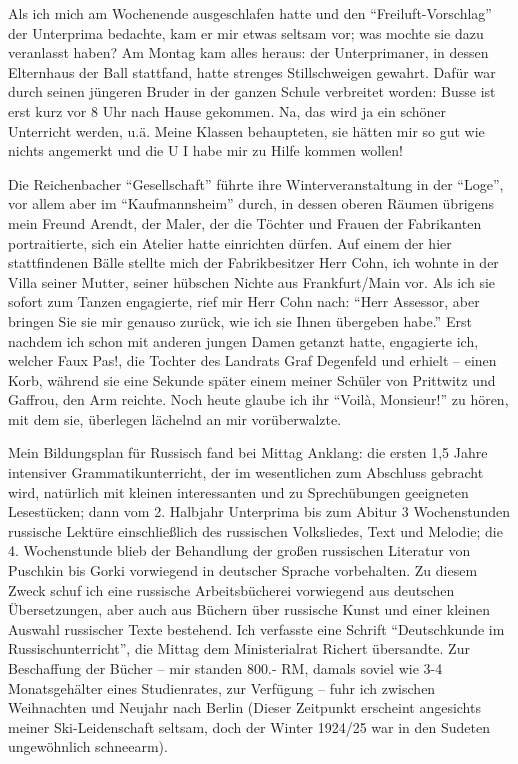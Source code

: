 \documentclass[a5paper,pagesize,10pt,twoside=true]{scrbook}
\begin{document}
Als ich mich am Wochenende ausgeschlafen hatte und den \enquote{Freiluft-Vor\-schlag} der Unterprima bedachte, kam er mir etwas seltsam vor; was mochte sie dazu veranlasst haben? Am Montag kam alles heraus: der Unterprimaner, in dessen Elternhaus der Ball stattfand, hatte strenges Stillschweigen gewahrt. Dafür war durch seinen jüngeren Bruder in der ganzen Schule verbreitet worden: Busse ist erst kurz vor 8 Uhr nach Hause gekommen. Na, das wird ja ein schöner Unterricht werden, u.ä. Meine Klassen behaupteten, sie hätten mir so gut wie nichts angemerkt und die U I habe mir zu Hilfe kommen wollen!

Die Reichenbacher \enquote{Gesellschaft} führte ihre Winterveranstaltung in der \enquote{Loge}, vor allem aber im \enquote{Kaufmannsheim} durch, in dessen oberen Räumen übrigens mein Freund Arendt, der Maler, der die Töchter und Frauen der Fabrikanten portraitierte, sich ein Atelier hatte einrichten dürfen. Auf einem der hier stattfindenen Bälle stellte mich der Fabrikbesitzer Herr Cohn, ich wohnte in der Villa seiner Mutter, seiner hübschen Nichte aus Frank\-furt/Main vor. Als ich sie sofort zum Tanzen engagierte, rief mir Herr Cohn nach: \enquote{Herr Assessor, aber bringen Sie sie mir genauso zurück, wie ich sie Ihnen übergeben habe.} Erst nachdem ich schon mit anderen jungen Damen getanzt hatte, engagierte ich, welcher Faux Pas!, die Tochter des Landrats Graf Degenfeld und erhielt -- einen Korb, während sie eine Sekunde später einem meiner Schüler von Prittwitz und Gaffrou, den Arm reichte. Noch heute glaube ich ihr \enquote{Voilà, Monsieur!} zu hören, mit dem sie, überlegen lächelnd an mir vorüberwalzte.

Mein Bildungsplan für Russisch fand bei Mittag Anklang: die ersten 1,5 Jahre intensiver Grammatikunterricht, der im wesentlichen zum Abschluss gebracht wird, natürlich mit kleinen interessanten und zu Sprechübungen geeigneten Lesestücken; dann vom 2. Halbjahr Unterprima bis zum Abitur 3 Wochenstunden russische Lektüre einschließlich des russischen Volksliedes, Text und Melodie; die 4. Wochenstunde blieb der Behandlung der großen russischen Literatur von Puschkin bis Gorki vorwiegend in deutscher Sprache vorbehalten. Zu diesem Zweck schuf ich eine russische Arbeitsbücherei vorwiegend aus deutschen Übersetzungen, aber auch aus Büchern über russische Kunst und einer kleinen Auswahl russischer Texte bestehend. Ich verfasste eine Schrift \enquote{Deutschkunde im Russischunterricht}, die Mittag dem Ministerialrat Richert übersandte. Zur Beschaffung der Bücher -- mir standen 800.- RM, damals soviel wie 3-4 Monatsgehälter eines Studienrates, zur Verfügung -- fuhr ich zwischen Weihnachten und Neujahr nach Berlin (Dieser Zeitpunkt erscheint angesichts meiner Ski-Leidenschaft seltsam, doch der Winter 1924/25 war in den Sudeten ungewöhnlich schneearm). 
\end{document}
